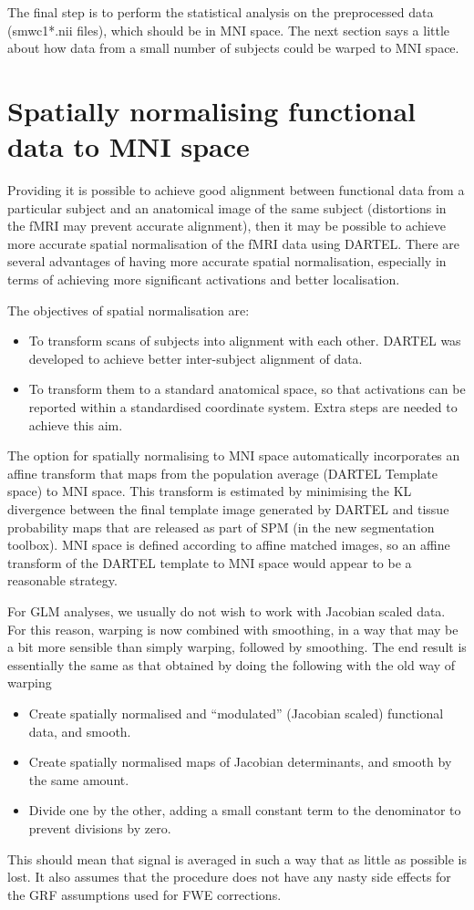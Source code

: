 The final step is to perform the statistical analysis on the preprocessed data (smwc1*.nii files), which should be in MNI space.
The next section says a little about how data from a small number of subjects could be warped to MNI space.



\section{Spatially normalising functional data to MNI space}
Providing it is possible to achieve good alignment between functional data from a particular subject and an anatomical image of the same subject (distortions in the fMRI may prevent accurate alignment), then it may be possible to achieve more accurate spatial normalisation of the fMRI data using DARTEL.
There are several advantages of having more accurate spatial normalisation, especially in terms of achieving more significant activations and better localisation.

The objectives of spatial normalisation are:
\begin{itemize}
\item{To transform scans of subjects into alignment with each other.
DARTEL was developed to achieve better inter-subject alignment of data.
}
\item{To transform them to a standard anatomical space, so that activations can be reported within a standardised coordinate system.
Extra steps are needed to achieve this aim.
}
\end{itemize}

The option for spatially normalising to MNI space automatically incorporates an affine transform that maps from the population average (DARTEL Template space) to MNI space.
This transform is estimated by minimising the KL divergence between the final template image generated by DARTEL and tissue probability maps that are released as part of SPM (in the new segmentation toolbox).  MNI space is defined according to affine matched images, so an affine transform of the DARTEL template to MNI space would appear to be a reasonable strategy.

For GLM analyses, we usually do not wish to work with Jacobian scaled data.
For this reason, warping is now combined with smoothing, in a way that may be a bit more
sensible than simply warping, followed by smoothing.  The end result is
essentially the same as that obtained by doing the following with the old way of warping
\begin{itemize}
\item{Create spatially normalised and ``modulated'' (Jacobian scaled) functional data, and smooth.}
\item{Create spatially normalised maps of Jacobian determinants, and smooth by the same amount.}
\item{Divide one by the other, adding a small constant term to the denominator to prevent divisions by zero.}
\end{itemize}
This should mean that signal is averaged in such a way that as little as possible
is lost.  It also assumes that the procedure does not have any nasty side
effects for the GRF assumptions used for FWE corrections.

